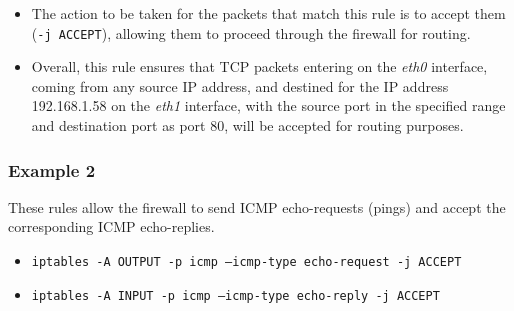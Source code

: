 {\begin{itemize}
		\item The action to be taken for the packets that match this rule is to accept them (\texttt{-j ACCEPT}), allowing them to proceed through the firewall for routing.
		
		\item Overall, this rule ensures that TCP packets entering on the \textit{eth0} interface, coming from any source IP address, and destined for the IP address 192.168.1.58 on the \textit{eth1} interface, with the source port in the specified range and destination port as port 80, will be accepted for routing purposes.
	\end{itemize}

	
	\newpage		
	\subsubsection{Example 2}
			These rules allow the firewall to send ICMP echo-requests (pings) and accept the corresponding ICMP echo-replies.
			\begin{itemize}
				\item \texttt{iptables -A OUTPUT -p icmp --icmp-type echo-request -j ACCEPT}
				\item \texttt{iptables -A INPUT -p icmp --icmp-type echo-reply -j ACCEPT}\\
			\end{itemize}
	
	}
